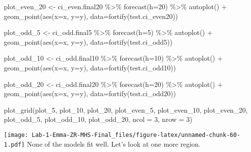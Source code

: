 \documentclass[
]{article}
\newenvironment{Shaded}{\begin{snugshade}}{\end{snugshade}}
\newcommand{\AttributeTok}[1]{\textcolor[rgb]{0.77,0.63,0.00}{#1}}
\newcommand{\DecValTok}[1]{\textcolor[rgb]{0.00,0.00,0.81}{#1}}
\newcommand{\FunctionTok}[1]{\textcolor[rgb]{0.00,0.00,0.00}{#1}}
\newcommand{\NormalTok}[1]{#1}
\newcommand{\OtherTok}[1]{\textcolor[rgb]{0.56,0.35,0.01}{#1}}
\newcommand{\SpecialCharTok}[1]{\textcolor[rgb]{0.00,0.00,0.00}{#1}}
\begin{document}
\begin{Shaded}
\begin{Highlighting}[]
\NormalTok{plot\_even\_20 }\OtherTok{\textless{}{-}}\NormalTok{ ci\_even.final20 }\SpecialCharTok{\%\textgreater{}\%}
  \FunctionTok{forecast}\NormalTok{(}\AttributeTok{h=}\DecValTok{20}\NormalTok{) }\SpecialCharTok{\%\textgreater{}\%}
  \FunctionTok{autoplot}\NormalTok{() }\SpecialCharTok{+} \FunctionTok{geom\_point}\NormalTok{(}\FunctionTok{aes}\NormalTok{(}\AttributeTok{x=}\NormalTok{x, }\AttributeTok{y=}\NormalTok{y), }\AttributeTok{data=}\FunctionTok{fortify}\NormalTok{(test.ci\_even20))}

\NormalTok{plot\_odd\_5 }\OtherTok{\textless{}{-}}\NormalTok{ ci\_odd.final5 }\SpecialCharTok{\%\textgreater{}\%}
  \FunctionTok{forecast}\NormalTok{(}\AttributeTok{h=}\DecValTok{5}\NormalTok{) }\SpecialCharTok{\%\textgreater{}\%}
  \FunctionTok{autoplot}\NormalTok{() }\SpecialCharTok{+} \FunctionTok{geom\_point}\NormalTok{(}\FunctionTok{aes}\NormalTok{(}\AttributeTok{x=}\NormalTok{x, }\AttributeTok{y=}\NormalTok{y), }\AttributeTok{data=}\FunctionTok{fortify}\NormalTok{(test.ci\_odd5))}

\NormalTok{plot\_odd\_10 }\OtherTok{\textless{}{-}}\NormalTok{ ci\_odd.final10 }\SpecialCharTok{\%\textgreater{}\%}
  \FunctionTok{forecast}\NormalTok{(}\AttributeTok{h=}\DecValTok{10}\NormalTok{) }\SpecialCharTok{\%\textgreater{}\%}
  \FunctionTok{autoplot}\NormalTok{() }\SpecialCharTok{+} \FunctionTok{geom\_point}\NormalTok{(}\FunctionTok{aes}\NormalTok{(}\AttributeTok{x=}\NormalTok{x, }\AttributeTok{y=}\NormalTok{y), }\AttributeTok{data=}\FunctionTok{fortify}\NormalTok{(test.ci\_odd10))}

\NormalTok{plot\_odd\_20 }\OtherTok{\textless{}{-}}\NormalTok{ ci\_odd.final20 }\SpecialCharTok{\%\textgreater{}\%}
  \FunctionTok{forecast}\NormalTok{(}\AttributeTok{h=}\DecValTok{20}\NormalTok{) }\SpecialCharTok{\%\textgreater{}\%}
  \FunctionTok{autoplot}\NormalTok{() }\SpecialCharTok{+} \FunctionTok{geom\_point}\NormalTok{(}\FunctionTok{aes}\NormalTok{(}\AttributeTok{x=}\NormalTok{x, }\AttributeTok{y=}\NormalTok{y), }\AttributeTok{data=}\FunctionTok{fortify}\NormalTok{(test.ci\_odd20))}

\FunctionTok{plot\_grid}\NormalTok{(plot\_5, plot\_10, plot\_20, plot\_even\_5, plot\_even\_10, plot\_even\_20, plot\_odd\_5, plot\_odd\_10, plot\_odd\_20, }\AttributeTok{ncol =} \DecValTok{3}\NormalTok{, }\AttributeTok{nrow =} \DecValTok{3}\NormalTok{)}
\end{Highlighting}
\end{Shaded}

\texttt{[image: Lab-1-Emma-ZR-MHS-Final\_files/figure-latex/unnamed-chunk-60-1.pdf]}
None of the models fit well. Let's look at one more region.
\end{document}
